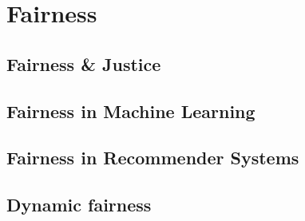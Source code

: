 \chapter{Fairness}
\label{fairness}


\section{Fairness \& Justice}

\section{Fairness in Machine Learning}


\section{Fairness in Recommender Systems}


\section{Dynamic fairness}

